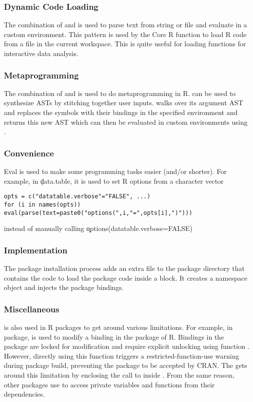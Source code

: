 \documentclass[USenglish,cleveref, autoref, thm-restate]{lipics-v2019}
\begin{document}
\subsubsection{Dynamic Code Loading} The combination of \parse and \eval is
used to parse text from string or file and evaluate in a custom environment.
This pattern is used by the \source Core R function to load R code from a
file in the current workspace. This is quite useful for loading functions
for interactive data analysis.

\subsubsection{Metaprogramming} The combination of \eval and \substitute is
 used to do metaprogramming in R. \substitute can be used to synthesize ASTs
 by stitching together user inputs. \substitute walks over its argument AST
 and replaces the symbols with their bindings in the specified environment
 and returns this new AST which can then be evaluated in custom environments
 using \eval.

  \subsubsection{Convenience} Eval is used to make some programming tasks easier (and/or shorter). For example, in \c{data.table}, it is used to set R options from a character vector
  \begin{lstlisting}
opts = c("datatable.verbose"="FALSE", ...)
for (i in names(opts)) eval(parse(text=paste0("options(",i,"=",opts[i],")")))

  \end{lstlisting}
  instead of manually calling \c{options(datatable.verbose=FALSE)}

  \subsubsection{Implementation}
  The package installation process adds an extra file to the package directory
  that contains the code to load the package code inside a \local block. It
  creates a namespace object and injects the package bindings.

  \subsubsection{Miscellaneous} \eval is also used in R packages to get around
  various limitations. For example, in \datatable package, \eval is used to
  modify a binding in the \base package of R. Bindings in the \base package are
  locked for modification and require explicit unlocking using
  function \unlockBinding. However, directly using this function triggers a
  restricted-function-use warning during package build, preventing the package
  to be accepted by CRAN. The \datatable gets around this limitation by
  enclosing the call to \unlockBinding inside \eval. From the same reason, other
  packages use \eval to access private variables and functions from their
  dependencies.
\end{document}
